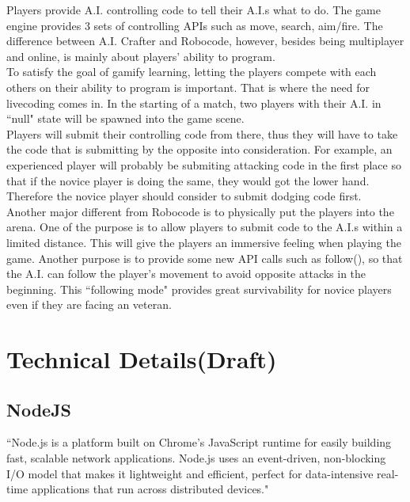 \documentclass[12pt]{article}
\begin{document}
Players provide A.I. controlling code to tell their A.I.s what to do. The game engine provides 3 sets of controlling APIs such as move, search, aim/fire. The difference between A.I. Crafter and Robocode, however, besides being multiplayer and online, is mainly about players' ability to program.\\

To satisfy the goal of gamify learning, letting the players compete with each others on their ability to program is important. That is where the need for livecoding comes in. In the starting of a match, two players with their A.I. in ``null" state will be spawned into the game scene.\\ 

Players will submit their controlling code from there, thus they will have to take the code that is submitting by the opposite into consideration. For example, an experienced player will probably be submiting attacking code in the first place so that if the novice player is doing the same, they would got the lower hand. Therefore the novice player should consider to submit dodging code first.\\ 

Another major different from Robocode is to physically put the players into the arena. One of the purpose is to allow players to submit code to the A.I.s within a limited distance. This will give the players an immersive feeling when playing the game. Another purpose is to provide some new API calls such as follow(), so that the A.I. can follow the player's movement to avoid opposite attacks in the beginning. This ``following mode" provides great survivability for novice players even if they are facing an veteran. 



\section{Technical Details(Draft)}

\subsection{NodeJS}
``Node.js is a platform built on Chrome's JavaScript runtime for easily building fast, scalable network applications. Node.js uses an event-driven, non-blocking I/O model that makes it lightweight and efficient, perfect for data-intensive real-time applications that run across distributed devices."\cite{nodejs}\\
\end{document}
